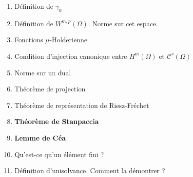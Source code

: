 \documentclass{article}
\begin{document}
\begin{enumerate}
\item Définition de $\gamma_0$
\item Définition de $W^{m,p}(\Omega)$. Norme sur cet espace.
\item Fonctions $\mu$-Holderienne
\item Condition d'injection canonique entre $H^m(\Omega)$ et $\mathcal{C}^s(\Omega)$
\item Norme sur un dual
\item Théorème de projection
\item Théorème de représentation de Riesz-Fréchet
\item \textbf{Théorème de Stanpaccia}
\item \textbf{Lemme de Céa}
\item Qu'est-ce qu'un élément fini ?
\item Définition d'unisolvance. Comment la démontrer ?
\end{enumerate}
\end{document}
